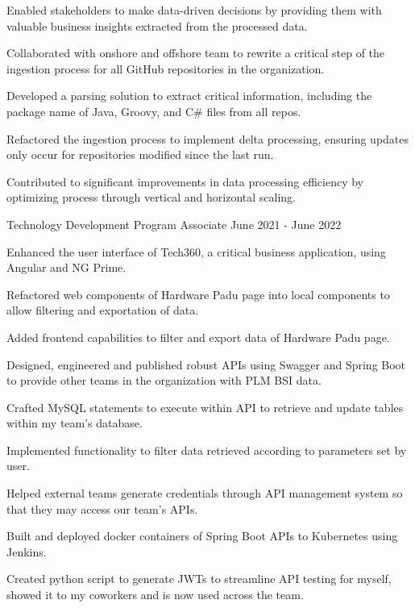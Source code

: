 \begin{cventries}
{\begin{cvitems}
        \item {Enabled stakeholders to make data-driven decisions by providing them with valuable business insights extracted from the processed data.}
        \item {Collaborated with onshore and offshore team to rewrite a critical step of the ingestion process for all GitHub repositories in the organization.}
        \item {Developed a parsing solution to extract critical information, including the package name of Java, Groovy, and C\# files from all repos.}
        \item {Refactored the ingestion process to implement delta processing, ensuring updates only occur for repositories modified since the last run.}
        \item {Contributed to significant improvements in data processing efficiency by optimizing process through vertical and horizontal scaling.}
      \end{cvitems}
    }
  \cventry
    {Technology Development Program Associate} %
    {} %
    {} %
    {June 2021 - June 2022} %
    {
      \begin{cvitems} %
        \item {Enhanced the user interface of Tech360, a critical business application, using Angular and NG Prime.}
        \item {Refactored web components of Hardware Padu page into local components to allow filtering and exportation of data.}
        \item {Added frontend capabilities to filter and export data of Hardware Padu page.}
        \item {Designed, engineered and published robust APIs using Swagger and Spring Boot to provide other teams in the organization with PLM BSI data.}
        \item {Crafted MySQL statements to execute within API to retrieve and update tables within my team's database.}
        \item {Implemented functionality to filter data retrieved according to parameters set by user.}
        \item {Helped external teams generate credentials through API management system so that they may access our team's APIs.}
        \item {Built and deployed docker containers of Spring Boot APIs to Kubernetes using Jenkins.}
        \item {Created python script to generate JWTs to streamline API testing for myself, showed it to my coworkers and is now used across the team.}
      \end{cvitems}
    }

\end{cventries}
